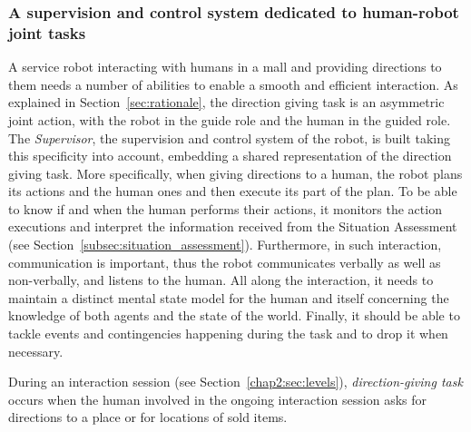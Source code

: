 \documentclass[a4paper,11pt,twoside]{StyleThese}
\begin{document}
\subsubsection{A supervision and control system dedicated to human-robot joint tasks}
A service robot interacting with humans in a mall and providing directions to them needs a number of abilities to enable a smooth and efficient interaction. As explained in Section~\ref{sec:rationale}, the direction giving task is an asymmetric joint action, with the robot in the guide role and the human in the guided role. The \emph{Supervisor}, the supervision and control system of the robot, is built taking this specificity into account, embedding a shared representation of the direction giving task. More specifically, when giving directions to a human, the robot plans its actions and the human ones and then execute its part of the plan. To be able to know if and when the human performs their actions, it monitors the action executions and interpret the information received from the Situation Assessment (see Section~\ref{subsec:situation_assessment}). Furthermore, in such interaction, communication is important, thus the robot communicates verbally as well as non-verbally, and listens to the human. All along the interaction, it needs to maintain a distinct mental state model for the human and itself concerning the knowledge of both agents and the state of the world. Finally, it should be able to tackle events and contingencies happening during the task and to drop it when necessary.

During an interaction session (see Section~\ref{chap2:sec:levels}), \emph{direction-giving task} occurs when the human involved in the ongoing interaction session  asks for directions to a place or for locations of sold items. 
\end{document}
